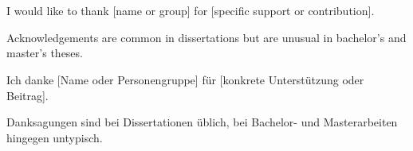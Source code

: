 \chapter*{\ackname}
\thispagestyle{empty}

\ifenglish
	I would like to thank [name or group] for [specific support or contribution].

	\begin{infobox}
		Acknowledgements are common in dissertations but are unusual in bachelor's
		and master's theses.
	\end{infobox}
\fi

\ifdeutsch
	Ich danke [Name oder Personengruppe] für [konkrete Unterstützung oder
			Beitrag].

	\begin{infobox}
		Danksagungen sind bei Dissertationen üblich, bei Bachelor- und
		Masterarbeiten hingegen untypisch.
	\end{infobox}
\fi
